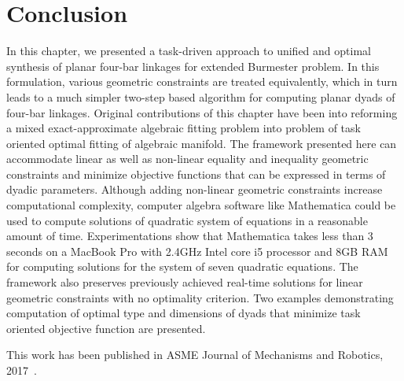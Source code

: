 \section{Conclusion}
In this chapter, we presented a task-driven approach to unified and optimal synthesis of planar four-bar linkages for extended Burmester problem. In this formulation, various geometric constraints are treated equivalently, which in turn leads to a much simpler two-step based algorithm for computing planar dyads of four-bar linkages. Original contributions of this chapter have been into reforming a mixed exact-approximate algebraic fitting problem into problem of task oriented optimal fitting of algebraic manifold. The framework presented here can accommodate linear as well as non-linear equality and inequality geometric constraints and minimize objective functions that can be expressed in terms of dyadic parameters. Although adding non-linear geometric constraints increase computational complexity, computer algebra software like Mathematica could be used to compute solutions of quadratic system of equations in a reasonable amount of time. Experimentations show that Mathematica takes less than 3 seconds on a MacBook Pro with 2.4GHz Intel core i5 processor and 8GB RAM for computing solutions for the system of seven quadratic equations. The framework also preserves previously achieved real-time solutions for linear geometric constraints with no optimality criterion. Two examples demonstrating computation of optimal type and dimensions of dyads that minimize task oriented objective function are presented.

This work has been published in ASME Journal of Mechanisms and Robotics, 2017~\cite{shrinathpurwar2017}.

